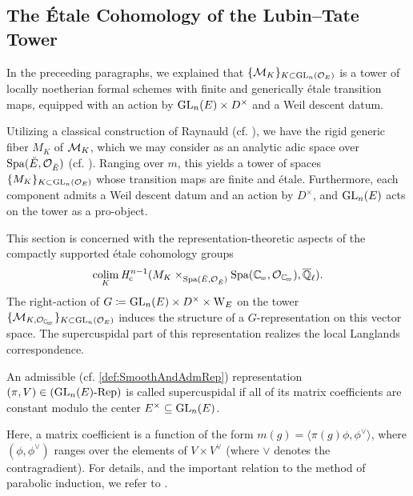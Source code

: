 \documentclass[../main.tex]{subfiles}
\begin{document}

\subsection{The \'Etale Cohomology of the Lubin--Tate Tower} %
\label{sub:The Local Langlands Correspondence for the General Linear Group}
In the preceeding paragraphs, we explained that $\{\mathcal{M}_{K}\}_{K \subset
\operatorname{GL}_n(\mathcal{O}_E)}$ is a 
tower of locally noetherian formal schemes with finite and generically \'etale 
transition maps, equipped with an action by $\operatorname{GL}_n(E) \times D^\times$ and 
a Weil descent datum. 

Utilizing a classical construction of Raynauld (cf. \cite{raynaud1974geometrie}),
we have the rigid generic fiber $M_{K}$ of $\mathcal{M}_{K}$, 
which we may consider as an analytic adic space over $\operatorname{Spa}({\breve {E}},\mathcal{O}_{\breve {E}})$ 
(cf. \cite[Section 1.9]{huber2013etale}). 
Ranging over $m$, this yields a tower of spaces $\{M_{K}\}_{K \subset
\operatorname{GL}_n(\mathcal{O}_E)}$ whose transition maps are finite and \'etale. Furthermore, each
component admits a Weil descent datum and an action by $D^\times$, and $\operatorname{GL}_n(E)$
acts on the tower as a pro-object.

This section is concerned with the representation-theoretic aspects of
the compactly supported \'etale cohomology groups
\begin{equation*}
  \colim_K \hHc^{n-1} (M_{K} \times_{\spa({\br E,\cO_\br E})} \Spa(\Cp, \cO_\Cp),
  \bar \Q_\ell).
\end{equation*}
The right-action of $G \coloneqq \operatorname{GL}_n(E) \times D^\times \times \mathrm W_E$ on the tower
$\{\cM_{K, \cO_\Cp}\}_{K \subset \GL_n(\cO_E)}$ induces the structure of a
$G$-representation on this vector space. 
The supercuspidal part of this representation realizes the local Langlands
correspondence. 

\begin{defi}\label{def:SuperCusp}
  An admissible (cf. \cref{def:SmoothAndAdmRep}) representation $(\pi,V) \in
  {({\operatorname{GL}_n(E)}\textnormal-\allowbreak\mathrm{Rep})}$ is called supercuspidal if all of its matrix coefficients are
  constant modulo the center $E^\times \subseteq \operatorname{GL}_n(E)$.
\end{defi}

Here, a matrix coefficient is a function of the form $m(g) = \langle \pi(g)
\phi, \phi^\vee\rangle$, where $(\phi, \phi^\vee)$ ranges over the elements of
$V \times V^\vee$ (where $\vee$ denotes the contragradient). For details, and
the important relation to the method of parabolic induction, we refer to
\cite[Section 8]{getz2023introduction}.
\end{document}
